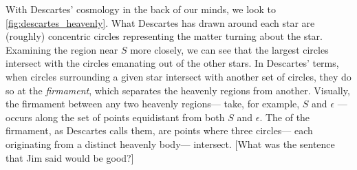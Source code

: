 \documentclass[12pt,twoside]{reedthesis}
\begin{document}
   With Descartes' cosmology in the back of our minds, we look to \cref{fig:descartes_heavenly}. What Descartes has drawn around each star are (roughly) concentric circles representing the matter turning about the star. Examining the region near $S$ more closely, we can see that the largest circles intersect with the circles emanating out of the other stars. In Descartes' terms, when circles surrounding a given star intersect with another set of circles, they do so at the \emph{firmament}, which separates the heavenly regions from another. Visually, the firmament between any two heavenly regions--- take, for example, $S$ and $\epsilon$ --- occurs along the set of points equidistant from both $S$ and $\epsilon$. The  of the firmament, as Descartes calls them, are points where three circles--- each originating from a distinct heavenly body--- intersect. [What was the sentence that Jim said would be good?]\par

\end{document}
